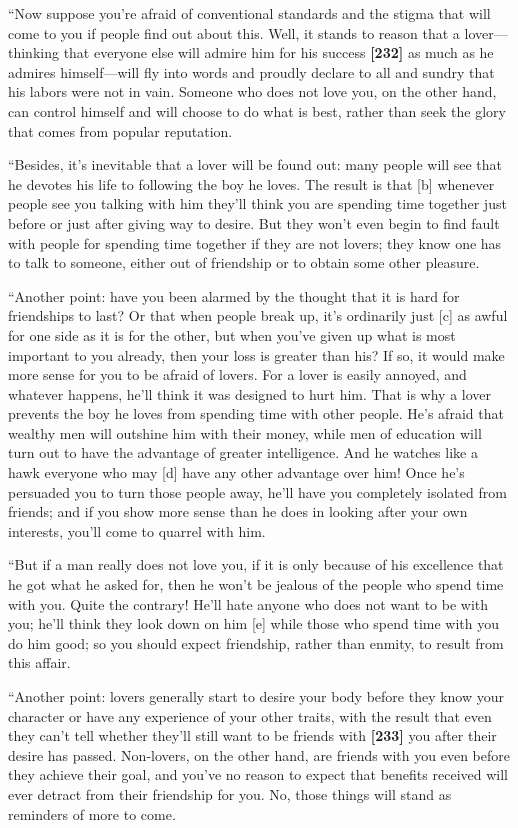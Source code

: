“Now suppose you're afraid of conventional standards and the stigma that
will come to you if people find out about this. Well, it stands to
reason that a lover---thinking that everyone else will admire him for
his success {\bf {[}232{]}} as much as he admires himself---will fly
into words and proudly declare to all and sundry that his labors were
not in vain. Someone who does not love you, on the other hand, can
control himself and will choose to do what is best, rather than seek the
glory that comes from popular reputation.

“Besides, it's inevitable that a lover will be found out: many people
will see that he devotes his life to following the boy he loves. The
result is that {[}b{]} whenever people see you talking with him they'll
think you are spending time together just before or just after giving
way to desire. But they won't even begin to find fault with people for
spending time together if they are not lovers; they know one has to talk
to someone, either out of friendship or to obtain some other pleasure.

“Another point: have you been alarmed by the thought that it is hard for
friendships to last? Or that when people break up, it's ordinarily just
{[}c{]} as awful for one side as it is for the other, but when you've
given up what is most important to you already, then your loss is
greater than his? If so, it would make more sense for you to be afraid
of lovers. For a lover is easily annoyed, and whatever happens, he'll
think it was designed to hurt him. That is why a lover prevents the boy
he loves from spending time with other people. He's afraid that wealthy
men will outshine him with their money, while men of education will turn
out to have the advantage of greater intelligence. And he watches like a
hawk everyone who may {[}d{]} have any other advantage over him! Once
he's persuaded you to turn those people away, he'll have you completely
isolated from friends; and if you show more sense than he does in
looking after your own interests, you'll come to quarrel with him.

“But if a man really does not love you, if it is only because of his
excellence that he got what he asked for, then he won't be jealous of
the people who spend time with you. Quite the contrary! He'll hate
anyone who does not want to be with you; he'll think they look down on
him {[}e{]} while those who spend time with you do him good; so you
should expect friendship, rather than enmity, to result from this
affair.

“Another point: lovers generally start to desire your body before they
know your character or have any experience of your other traits, with
the result that even they can't tell whether they'll still want to be
friends with {\bf {[}233{]}} you after their desire has passed.
Non-lovers, on the other hand, are friends with you even before they
achieve their goal, and you've no reason to expect that benefits
received will ever detract from their friendship for you. No, those
things will stand as reminders of more to come.


